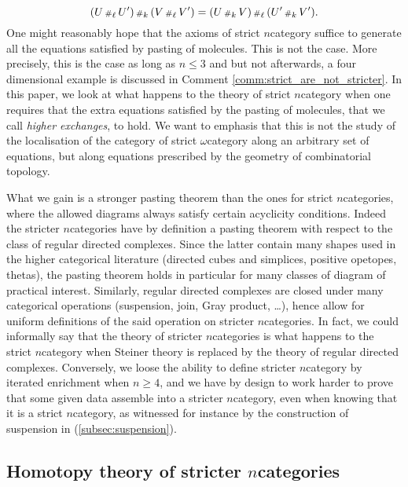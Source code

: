 \begin{equation*}
    (U \,{\scriptstyle\#}_{\ell}\, U') \,{\scriptstyle\#}_{k}\, (V \,{\scriptstyle\#}_{\ell}\, V') = (U \,{\scriptstyle\#}_{k}\, V) \,{\scriptstyle\#}_{\ell}\, (U' \,{\scriptstyle\#}_{k}\, V').
\end{equation*}
One might reasonably hope that the axioms of strict \( n \)\nbd category suffice to generate all the equations satisfied by pasting of molecules.
This is not the case.
More precisely, this is the case as long as \( n \le 3 \) and but not afterwards, a four dimensional example is discussed in Comment \ref{comm:strict_are_not_stricter}.
In this paper, we look at what happens to the theory of strict \( n \)\nbd category when one requires that the extra equations satisfied by the pasting of molecules, that we call \emph{higher exchanges}, to hold.
We want to emphasis that this is not the study of the localisation of the category of strict \( \omega \)\nbd category along an arbitrary set of equations, but along equations prescribed by the geometry of combinatorial topology.

What we gain is a stronger pasting theorem than the ones for strict \( n \)\nbd categories, where the allowed diagrams always satisfy certain acyclicity conditions.
Indeed the stricter \( n \)\nbd categories have by definition a pasting theorem with respect to the class of regular directed complexes. 
Since the latter contain many shapes used in the higher categorical literature (directed cubes and simplices, positive opetopes, thetas), the pasting theorem holds in particular for many classes of diagram of practical interest.   
Similarly, regular directed complexes are closed under many categorical operations (suspension, join, Gray product, \dots), hence allow for uniform definitions of the said operation on stricter \( n \)\nbd categories.
In fact, we could informally say that the theory of stricter \( n \)\nbd categories is what happens to the strict \( n \)\nbd category when Steiner theory is replaced by the theory of regular directed complexes.
Conversely, we loose the ability to define stricter \( n \)\nbd category by iterated enrichment when \( n \geq 4 \), and we have by design to work harder to prove that some given data assemble into a stricter \( n \)\nbd category, even when knowing that it is a strict \( n \)\nbd category, as witnessed for instance by the construction of suspension in (\ref{subsec:suspension}). 

\subsection*{Homotopy theory of stricter \( n \)\nbd categories}

